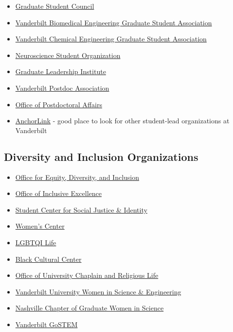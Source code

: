 \documentclass[
]{book}
\begin{document}
\begin{itemize}
\item
  \href{https://studentorg.vanderbilt.edu/gsc/}{Graduate Student Council}
\item
  \href{https://anchorlink.vanderbilt.edu/organization/bme_gsa}{Vanderbilt Biomedical Engineering Graduate Student Association}
\item
  \href{https://engineering.vanderbilt.edu/chbe/GraduateProgram/CHEGSA.php}{Vanderbilt Chemical Engineering Graduate Student Association}
\item
  \href{https://medschool.vanderbilt.edu/brain-institute/new-vbi-homepage-inprogress/resources-for-students/neuroscience-student-organization/}{Neuroscience Student Organization}
\item
  \href{https://gradschool.vanderbilt.edu/gli/}{Graduate Leadership Institute}
\item
  \href{https://www.vanderbilt.edu/vpa/index.php}{Vanderbilt Postdoc Association}
\item
  \href{https://www.vanderbilt.edu/postdoc/}{Office of Postdoctoral Affairs}
\item
  \href{https://anchorlink.vanderbilt.edu/}{AnchorLink} - good place to look for other student-lead organizations at Vanderbilt
\end{itemize}

\hypertarget{diversity-and-inclusion-organizations}{%
\subsection{Diversity and Inclusion Organizations}\label{diversity-and-inclusion-organizations}}

\begin{itemize}
\item
  \href{https://www.vanderbilt.edu/diversity/contact/}{Office for Equity, Diversity, and Inclusion}
\item
  \href{https://www.vanderbilt.edu/inclusive-excellence/index.php}{Office of Inclusive Excellence}
\item
  \href{https://www.vanderbilt.edu/scsji/}{Student Center for Social Justice \& Identity}
\item
  \href{https://www.vanderbilt.edu/WomensCenter/}{Women's Center}
\item
  \href{https://www.vanderbilt.edu/lgbtqi/}{LGBTQI Life}
\item
  \href{https://www.vanderbilt.edu/bcc/}{Black Cultural Center}
\item
  \href{https://www.vanderbilt.edu/religiouslife/}{Office of University Chaplain and Religious Life}
\item
  \href{https://my.vanderbilt.edu/vuwise/}{Vanderbilt University Women in Science \& Engineering}
\item
  \href{https://gwisnashville.wixsite.com/gwisnashville}{Nashville Chapter of Graduate Women in Science}
\item
  \href{https://www.vanderbilt.edu/lgbtqi/programs/student-groups}{Vanderbilt GoSTEM}
\end{itemize}
\end{document}
